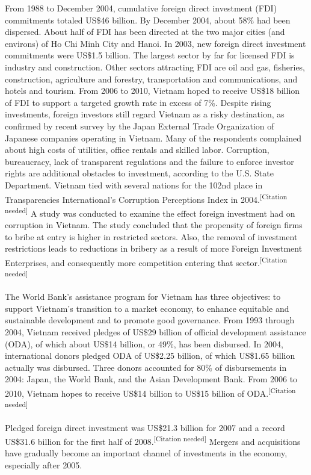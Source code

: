 \documentclass{article}
\begin{document}
From 1988 to December 2004, cumulative foreign direct investment (FDI) commitments totaled US\$46 billion. By December 2004, about 58\% had been dispersed. About half of FDI has been directed at the two major cities (and environs) of Ho Chi Minh City and Hanoi. In 2003, new foreign direct investment commitments were US\$1.5 billion. The largest sector by far for licensed FDI is industry and construction. Other sectors attracting FDI are oil and gas, fisheries, construction, agriculture and forestry, transportation and communications, and hotels and tourism. From 2006 to 2010, Vietnam hoped to receive US\$18 billion of FDI to support a targeted growth rate in excess of 7\%. Despite rising investments, foreign investors still regard Vietnam as a risky destination, as confirmed by recent survey by the Japan External Trade Organization of Japanese companies operating in Vietnam. Many of the respondents complained about high costs of utilities, office rentals and skilled labor. Corruption, bureaucracy, lack of transparent regulations and the failure to enforce investor rights are additional obstacles to investment, according to the U.S. State Department. Vietnam tied with several nations for the 102nd place in Transparencies International's Corruption Perceptions Index in 2004.\textsuperscript{[Citation needed]} A study was conducted to examine the effect foreign investment had on corruption in Vietnam. The study concluded that the propensity of foreign firms to bribe at entry is higher in restricted sectors. Also, the removal of investment restrictions leads to reductions in bribery as a result of more Foreign Investment Enterprises, and consequently more competition entering that sector.\textsuperscript{[Citation needed]}

The World Bank's assistance program for Vietnam has three objectives: to support Vietnam's transition to a market economy, to enhance equitable and sustainable development and to promote good governance. From 1993 through 2004, Vietnam received pledges of US\$29 billion of official development assistance (ODA), of which about US\$14 billion, or 49\%, has been disbursed. In 2004, international donors pledged ODA of US\$2.25 billion, of which US\$1.65 billion actually was disbursed. Three donors accounted for 80\% of disbursements in 2004: Japan, the World Bank, and the Asian Development Bank. From 2006 to 2010, Vietnam hopes to receive US\$14 billion to US\$15 billion of ODA.\textsuperscript{[Citation needed]}

Pledged foreign direct investment was US\$21.3 billion for 2007 and a record US\$31.6 billion for the first half of 2008.\textsuperscript{[Citation needed]} Mergers and acquisitions have gradually become an important channel of investments in the economy, especially after 2005.
\end{document}
